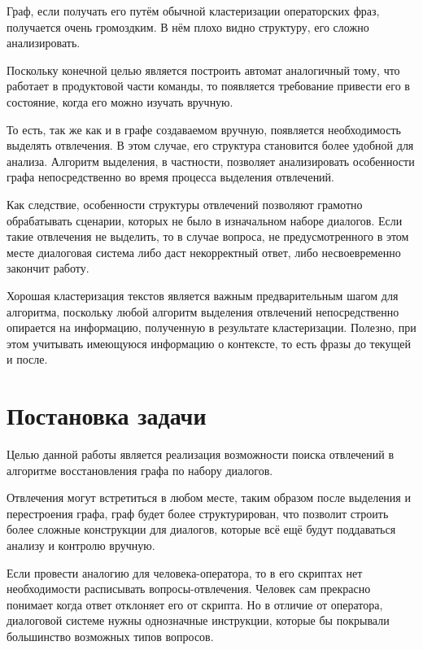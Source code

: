 \documentclass[times,specification,annotation]{itmo-student-thesis}
\begin{document}
	Граф, если получать его путём обычной кластеризации операторских фраз, получается очень громоздким. В нём плохо видно структуру, его сложно анализировать.
	
	Поскольку конечной целью является построить автомат аналогичный тому, что работает в продуктовой части команды, то появляется требование привести его в состояние, когда его можно изучать вручную. 
	
	То есть, так же как и в графе создаваемом вручную, появляется необходимость выделять отвлечения. В этом случае, его структура становится более удобной для анализа. Алгоритм выделения, в частности, позволяет анализировать особенности графа непосредственно во время процесса выделения отвлечений. 
	
	Как следствие, особенности структуры отвлечений позволяют грамотно обрабатывать сценарии, которых не было в изначальном наборе диалогов. Если такие отвлечения не выделить, то в случае вопроса, не предусмотренного в этом месте диалоговая система либо даст некорректный ответ, либо несвоевременно закончит работу.
	
	Хорошая кластеризация текстов является важным предварительным шагом для алгоритма, поскольку любой алгоритм выделения отвлечений непосредственно опирается на информацию, полученную в результате кластеризации. Полезно, при этом учитывать имеющуюся информацию о контексте, то есть фразы до текущей и после.
	
	
	\section{Постановка задачи}
	Целью данной работы является реализация возможности поиска отвлечений в алгоритме восстановления графа по набору диалогов.

	Отвлечения могут встретиться в любом месте, таким образом после выделения и перестроения графа, граф будет более структурирован, что позволит строить более сложные конструкции для диалогов, которые всё ещё будут поддаваться анализу и контролю вручную.
	
	Если провести аналогию для человека-оператора, то в его скриптах нет необходимости расписывать вопросы-отвлечения. Человек сам прекрасно понимает когда ответ отклоняет его от скрипта. Но в отличие от оператора, диалоговой системе нужны однозначные инструкции, которые бы покрывали большинство возможных типов вопросов.
	
\end{document}
